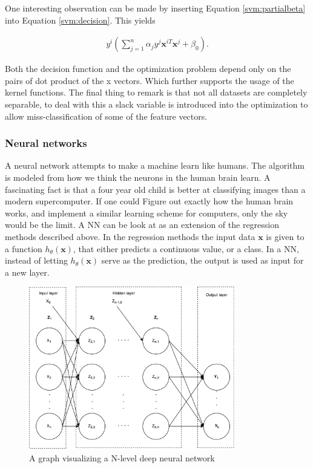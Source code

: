             
            
            
            One interesting observation can be made by inserting Equation \ref{svm:partialbeta} into Equation \ref{svm:decision}. This yields 
            
            \begin{align}
                y^i(\sum_{j=1}^n \alpha_j y^j \bm x^{iT}\bm x^j + \beta_0).
                \label{svm:decision2}    
            \end{align}
            
            Both the decision function and the optimization problem depend only on the pairs of dot product of the x vectors. Which further supports the usage of the kernel functions. The final thing to remark is that not all datasets are completely separable, to deal with this a slack variable is introduced into the optimization to allow miss-classification of some of the feature vectors. 

    
            \subsubsection{Neural networks}
            A neural network attempts to make a machine learn like humans. The algorithm is modeled from how we think the neurons in the human brain learn. A fascinating fact is that a four year old child is better at classifying images than a modern supercomputer. If one could Figure out exactly how the human brain works, and implement a similar learning scheme for computers, only the sky would be the limit. A NN can be look at as an extension of the regression methods described above. In the regression methods the input data $\bm x$ is given to a function $h_\theta(\bm x)$, that either predicts a continuous value, or a class. In a NN, instead of letting $h_{\theta}(\bm x)$ serve as the prediction, the output is used as input for a new layer.
            
            \begin{figure}[h]
                \centering
                \includegraphics[width=0.8\textwidth]{figures/machineLearning/neural_network.pdf}
                \caption{A graph visualizing a N-level deep neural network}
                \label{fig:nn_fullnetwork}
            \end{figure}
            
